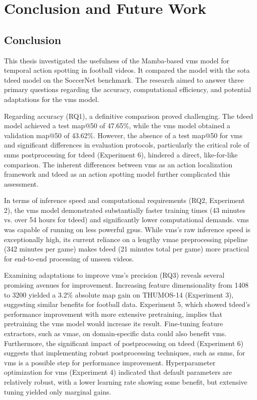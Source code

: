 \chapter{Conclusion and Future Work}
\label{chap:conclusion}

\section{Conclusion}
\label{sec:conclusion}
This thesis investigated the usefulness of the Mamba-based \acrfull{vms} model for temporal action spotting in football videos. It compared the model with the \acrfull{sota} \acrfull{tdeed} model on the SoccerNet benchmark. The research aimed to answer three primary questions regarding the accuracy, computational efficiency, and potential adaptations for the \acrshort{vms} model.

Regarding accuracy (RQ1), a definitive comparison proved challenging. The \acrshort{tdeed} model achieved a test \acrshort{map}@50 of 47.65\%, while the \acrshort{vms} model obtained a validation \acrshort{map}@50 of 43.62\%. However, the absence of a test \acrshort{map}@50 for \acrshort{vms} and significant differences in evaluation protocols, particularly the critical role of \acrfull{snms} postprocessing for \acrshort{tdeed} (Experiment 6), hindered a direct, like-for-like comparison. The inherent differences between \acrshort{vms} as an action localization framework and \acrshort{tdeed} as an action spotting model further complicated this assessment.

In terms of inference speed and computational requirements (RQ2, Experiment 2), the \acrshort{vms} model demonstrated substantially faster training times (43 minutes vs. over 54 hours for \acrshort{tdeed}) and significantly lower computational demands. \acrshort{vms} was capable of running on less powerful \acrshort{gpu}s. While \acrshort{vms}'s raw inference speed is exceptionally high, its current reliance on a lengthy \acrshort{vmae} preprocessing pipeline (342 minutes per game) makes \acrshort{tdeed} (21 minutes total per game) more practical for end-to-end processing of unseen videos.

Examining adaptations to improve \acrshort{vms}'s precision (RQ3) reveals several promising avenues for improvement. Increasing feature dimensionality from 1408 to 3200 yielded a 3.2\% absolute \acrshort{map} gain on THUMOS-14 (Experiment 3), suggesting similar benefits for football data. Experiment 5, which showed \acrshort{tdeed}'s performance improvement with more extensive pretraining, implies that pretraining the \acrshort{vms} model would increase its result. Fine-tuning feature extractors, such as \acrshort{vmae}, on domain-specific data could also benefit \acrshort{vms}. Furthermore, the significant impact of postprocessing on \acrshort{tdeed} (Experiment 6) suggests that implementing robust postprocessing techniques, such as \acrshort{snms}, for \acrshort{vms} is a possible step for performance improvement. Hyperparameter optimization for \acrshort{vms} (Experiment 4) indicated that default parameters are relatively robust, with a lower learning rate showing some benefit, but extensive tuning yielded only marginal gains.


